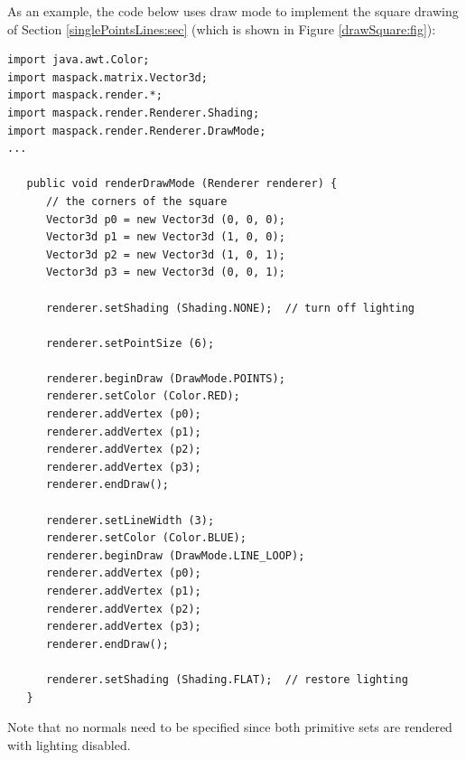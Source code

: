 As an example, the code below uses draw mode to implement the square
drawing of Section \ref{singlePointsLines:sec} (which is shown in Figure
\ref{drawSquare:fig}):
%
\begin{lstlisting}[]
import java.awt.Color;
import maspack.matrix.Vector3d;
import maspack.render.*;
import maspack.render.Renderer.Shading;
import maspack.render.Renderer.DrawMode;
...
   
   public void renderDrawMode (Renderer renderer) {
      // the corners of the square
      Vector3d p0 = new Vector3d (0, 0, 0);
      Vector3d p1 = new Vector3d (1, 0, 0);
      Vector3d p2 = new Vector3d (1, 0, 1);
      Vector3d p3 = new Vector3d (0, 0, 1);
      
      renderer.setShading (Shading.NONE);  // turn off lighting
   
      renderer.setPointSize (6);
   
      renderer.beginDraw (DrawMode.POINTS);
      renderer.setColor (Color.RED);
      renderer.addVertex (p0);
      renderer.addVertex (p1);
      renderer.addVertex (p2);
      renderer.addVertex (p3);
      renderer.endDraw();
   
      renderer.setLineWidth (3);
      renderer.setColor (Color.BLUE);
      renderer.beginDraw (DrawMode.LINE_LOOP);
      renderer.addVertex (p0);
      renderer.addVertex (p1);
      renderer.addVertex (p2);
      renderer.addVertex (p3);
      renderer.endDraw();
   
      renderer.setShading (Shading.FLAT);  // restore lighting
   }
\end{lstlisting}
%
Note that no normals need to be specified since both primitive sets
are rendered with lighting disabled.

